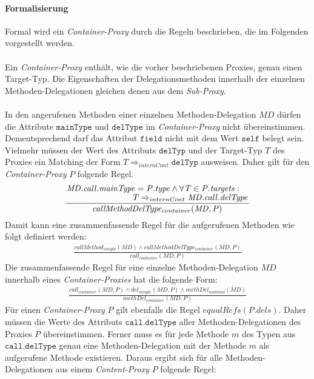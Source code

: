 \paragraph{Formalisierung}
Formal wird ein \emph{Container-Proxy} durch die Regeln beschrieben, die im Folgenden vorgestellt werden.\\\\
Ein \emph{Container-Proxy} enthält, wie die vorher beschriebenen Proxies, genau einen Target-Typ. Die Eigenschaften der Delegationsmethoden innerhalb der einzelnen Methoden-Delegationen gleichen denen aus dem \emph{Sub-Proxy}.\\\\
In den angerufenen Methoden einer einzelnen Methoden-Delegation $\mathit{MD}$ dürfen die Attribute $\texttt{mainType}$ und $\texttt{delType}$ im \emph{Container-Proxy} nicht übereinstimmen. Dementsprechend darf das Attribut $\texttt{field}$ nicht mit dem Wert $\texttt{self}$ belegt sein. Vielmehr müssen der Wert des Attributs $\texttt{delTyp}$ und der Target-Typ $T$ des Proxies ein Matching der Form $T \Rightarrow_{internCont} \texttt{delTyp}$ ausweisen. Daher gilt für den \emph{Container-Proxy} $P$ folgende Regel.
\begin{gather*}
\frac{\splitfrac{\mathit{MD.call.mainType} = \mathit{P.type} \wedge \forall \mathit{T} \in \mathit{P.targets}:}
{  \mathit{T} \Rightarrow_{internCont} \mathit{MD.call.delType}}
}
{\mathit{callMethodDelType_{container}(MD,P)}}
\end{gather*}
\noindent
Damit kann eine zusammenfassende Regel für die aufgerufenen Methoden wie folgt definiert werden:
\begin{gather*}
\frac{\mathit{callMethod_{simple}(MD)} \wedge \mathit{callMethodDelType_{container}(MD,P)}}
{\mathit{call_{container}(MD,P)}}
\end{gather*}
Die zusammenfassende Regel für eine einzelne Methoden-Delegation $\mathit{MD}$ innerhalb eines \emph{Container-Proxies} hat die folgende Form:
\begin{gather*}
\frac{\mathit{call_{container}(MD,P)} \wedge \mathit{del_{simple}(MD,P)} \wedge \mathit{methDel_{nominal}(MD)}}
{\mathit{methDel_{container}(MD,P)}}
\end{gather*}
Für einen \emph{Container-Proxy} $P$ gilt ebenfalls die Regel $\mathit{equalRefs(P.dels)}$. Daher müssen die Werte des Attributs $\texttt{call.delType}$ aller Methoden-Delegationen des Proxies $P$ übereinstimmen. Ferner muss es für jede Methode $m$ des Typen aus $\texttt{call.delType}$ genau eine Methoden-Delegation mit der Methode $m$ als aufgerufene Methode existieren. Daraus ergibt sich für alle Methoden-Delegationen aus einem \emph{Content-Proxy} $P$ folgende Regel:
